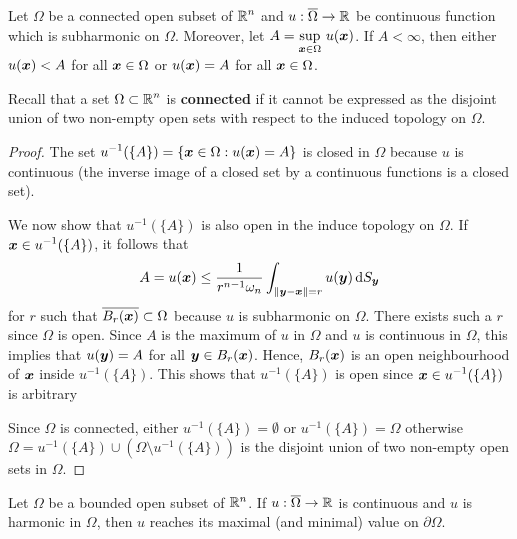 \begin{theorem} \label{laplace_HMP}
Let $\Omega$ be a connected open subset of $\displaystyle \mathbb{R}^n$ and
$u:\overline{\Omega}\rightarrow \mathbb{R}$ be continuous function which is
subharmonic on $\Omega$.  Moreover, let 
$\displaystyle A = \sup_{{\bm{x}}\in \Omega}\, u({\bm{x}})$.
If $A<\infty$, then either $u({\bm{x}}) < A$ for all ${\bm{x}} \in \Omega$ or
$u({\bm{x}}) = A$ for all ${\bm{x}} \in \Omega$.
\end{theorem}

\begin{rmk}
Recall that a set $\displaystyle \Omega \subset \mathbb{R}^n$ is
{\bfseries connected} if it cannot be
expressed as the disjoint union of two non-empty open sets with
respect to the induced topology on $\Omega$.
\end{rmk}

\begin{proof}
The set
$\displaystyle u^{-1}(\{A\})
= \left\{ {\bm{x}}\in \Omega : u({\bm{x}}) = A \right\}$
is closed in $\Omega$ because $u$ is continuous (the inverse image of a
closed set by a continuous functions is a closed set).

We now show that $\displaystyle u^{-1}(\{A\})$ is also open in the
induce topology on $\Omega$.  If
$\displaystyle {\bm{x}} \in u^{-1}(\{A\})$, it follows that
\[
A = u({\bm{x}}) \leq \frac{1}{r^{n-1}\omega_n} \int_{\|{\bm{y}}-{\bm{x}}\|=r}
u({\bm{y}}) \,\mathrm{d}{S}_{{\bm{y}}}
\]
for $r$ such that $\overline{B_r({\bm{x}})}\subset \Omega$ because
$u$ is subharmonic on $\Omega$.  There exists such a $r$ since $\Omega$ is
open.  Since $A$ is the maximum of $u$ in $\Omega$ and $u$ is continuous in
$\Omega$, this implies that $u({\bm{y}}) = A$ for all
${\bm{y}} \in B_r({\bm{x}})$.  Hence, $B_r({\bm{x}})$ is an open
neighbourhood of ${\bm{x}}$ inside $\displaystyle u^{-1}(\{A\})$.
This shows that $\displaystyle u^{-1}(\{A\})$ is open since
$\displaystyle {\bm{x}} \in u^{-1}(\{A\})$ is arbitrary

Since $\Omega$ is connected, either
$\displaystyle u^{-1}(\{A\}) = \emptyset$ or
$\displaystyle u^{-1}(\{A\}) = \Omega$ otherwise
$\displaystyle \Omega = u^{-1}(\{A\}) \cup
(\Omega \setminus u^{-1}(\{A\}))$ is the disjoint
union of two non-empty open sets in $\Omega$.
\end{proof}

\begin{cor} \label{laplace_cHMP}
Let $\Omega$ be a bounded open subset of $\mathbb{R}^n$.  If
$u:\overline{\Omega} \rightarrow \mathbb{R}$ is continuous and $u$ is
harmonic in $\Omega$, then $u$ reaches its maximal (and minimal) value
on $\partial \Omega$.
\end{cor}

